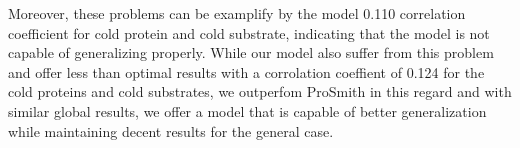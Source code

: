 Moreover, these problems can be examplify by the model 0.110 correlation coefficient for cold protein and cold 
substrate, indicating that the model is not capable of generalizing properly. While our model also suffer from
this problem and offer less than optimal results with a corrolation coeffient of 0.124 for the cold proteins and
cold substrates, we outperfom ProSmith in this regard and with similar global results, we
offer a model that is capable of better generalization while maintaining decent results for the general case.
